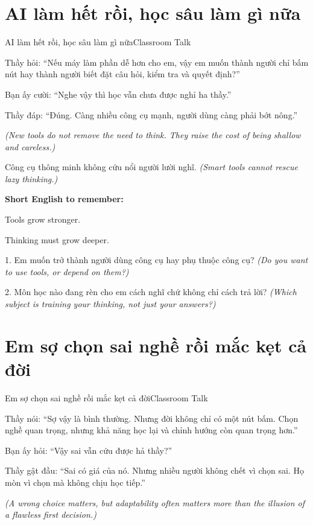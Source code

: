 \section{AI làm hết rồi, học sâu làm gì nữa}
\begin{truyen}{AI làm hết rồi, học sâu làm gì nữa}{Classroom Talk}

Thầy hỏi: ``Nếu máy làm phần dễ hơn cho em, vậy em muốn thành người chỉ bấm nút hay thành người biết đặt câu hỏi, kiểm tra và quyết định?''

Bạn ấy cười: ``Nghe vậy thì học vẫn chưa được nghỉ ha thầy.''

Thầy đáp: ``Đúng. Càng nhiều công cụ mạnh, người dùng càng phải bớt nông.''

\textit{(New tools do not remove the need to think. They raise the cost of being shallow and careless.)}
\end{truyen}

\begin{baihoc}
Công cụ thông minh không cứu nổi người lười nghĩ.
\textit{(Smart tools cannot rescue lazy thinking.)}
\end{baihoc}

\begin{ghinhoanh}
\textbf{Short English to remember:}

Tools grow stronger.

Thinking must grow deeper.
\end{ghinhoanh}

\begin{tuhocnhanh}
1. Em muốn trở thành người dùng công cụ hay phụ thuộc công cụ? \textit{(Do you want to use tools, or depend on them?)}

2. Môn học nào đang rèn cho em cách nghĩ chứ không chỉ cách trả lời? \textit{(Which subject is training your thinking, not just your answers?)}
\end{tuhocnhanh}
\ngancach

\section{Em sợ chọn sai nghề rồi mắc kẹt cả đời}
\begin{truyen}{Em sợ chọn sai nghề rồi mắc kẹt cả đời}{Classroom Talk}

Thầy nói: ``Sợ vậy là bình thường. Nhưng đời không chỉ có một nút bấm. Chọn nghề quan trọng, nhưng khả năng học lại và chỉnh hướng còn quan trọng hơn.''

Bạn ấy hỏi: ``Vậy sai vẫn cứu được hả thầy?''

Thầy gật đầu: ``Sai có giá của nó. Nhưng nhiều người không chết vì chọn sai. Họ mòn vì chọn mà không chịu học tiếp.''

\textit{(A wrong choice matters, but adaptability often matters more than the illusion of a flawless first decision.)}
\end{truyen}

